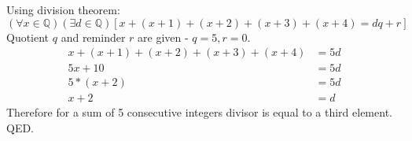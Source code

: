 \documentclass{article}
\begin{document}
Using division theorem:
\newline
$$(\forall x \in \mathbb{Q})(\exists d \in \mathbb{Q})[x+(x+1)+(x+2)+(x+3)+(x+4)=dq+r]$$
\newline
Quotient $q$ and reminder $r$ are given - $q = 5, r = 0$.
\newline
\begin{align*}
x+(x+1)+(x+2)+(x+3)+(x+4)&=5d\\
5x + 10 &= 5d \tag*{(By algebra)}\\
5*(x+2)&=5d\\
x+2&=d
\end{align*}
\newline
Therefore for a sum of 5 consecutive integers divisor is equal to a third element.
\newline
QED.
\end{document}
